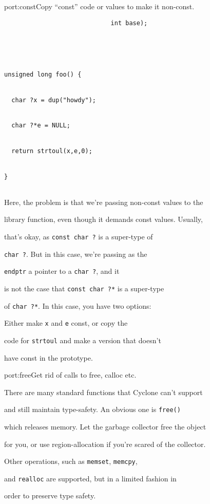 \begin{porta}{port:const}{Copy ``const'' code or values to make it non-const.}
\begin{verbatim}
                             int base);





unsigned long foo() {


  char ?x = dup("howdy");


  char ?*e = NULL;


  return strtoul(x,e,0);


}


\end{verbatim}


Here, the problem is that we're passing non-const values to the


library function, even though it demands const values.  Usually,


that's okay, as \texttt{const char ?} is a super-type of


\texttt{char ?}.  But in this case, we're passing as the


\texttt{endptr} a pointer to a \texttt{char ?}, and it


is not the case that \texttt{const char ?*} is a super-type


of \texttt{char ?*}.  In this case, you have two options:


Either make \texttt{x} and \texttt{e} const, or copy the


code for \texttt{strtoul} and make a version that doesn't


have const in the prototype.  


\end{porta}





\begin{porta}{port:free}{Get rid of calls to free, calloc etc.}





There are many standard functions that Cyclone can't support 


and still maintain type-safety.  An obvious one is \texttt{free()}


which releases memory.  Let the garbage collector free the object


for you, or use region-allocation if you're scared of the collector.


Other operations, such as \texttt{memset}, \texttt{memcpy}, 


and \texttt{realloc} are supported, but in a limited fashion in 


order to preserve  type safety.  


\end{porta}





